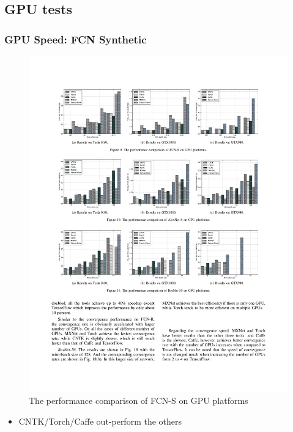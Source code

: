 \subsection{GPU tests}

\begin{frame}
	\MyLogo
	\frametitle{GPU Speed: FCN Synthetic}

	\begin{figure}[htbp] 
		\includegraphics[width=\linewidth]{figures/FCN-S2.pdf} 
		\caption{The performance comparison of FCN-S on GPU platforms}
	\end{figure}

\pause

\vskip -10pt
\begin{mdframed}[style=mystyle1]
\begin{itemize}
\item CNTK/Torch/Caffe out-perform the others
\end{itemize}
\end{mdframed}

\end{frame}

